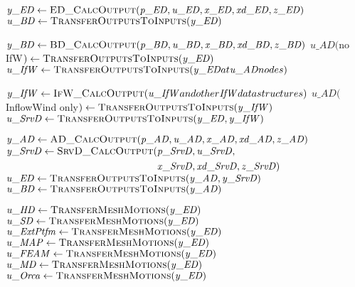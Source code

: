 \documentclass[10pt,letterpaper,oneside,notitlepage]{article}
\begin{document}
\begin{algorithmic}[1]

\State
   \State $\mathit{y\_ED} \gets \Call{ED\_CalcOutput}{\mathit{p\_ED},\mathit{u\_ED},\mathit{x\_ED},\mathit{xd\_ED},\mathit{z\_ED}}$
   \State $\mathit{u\_BD}  \gets \Call{TransferOutputsToInputs}{\mathit{y\_ED}}$

\State
   \State $\mathit{y\_BD} \gets \Call{BD\_CalcOutput}{\mathit{p\_BD},\mathit{u\_BD},\mathit{x\_BD},\mathit{xd\_BD},\mathit{z\_BD}}$
   \State $\mathit{u\_AD}($no IfW$)  \gets \Call{TransferOutputsToInputs}{\mathit{y\_ED}}$
   \State $\mathit{u\_IfW} \gets \Call{TransferOutputsToInputs}{\mathit{y\_ED} at \mathit{u\_AD} nodes}$

\State
   \State $\mathit{y\_IfW} \gets \Call{IfW\_CalcOutput}{\mathit{u\_IfW} and other \mathit{IfW} data structures}$
   \State $\mathit{u\_AD}($InflowWind only$) \gets \Call{TransferOutputsToInputs}{\mathit{y\_IfW}}$
   \State $\mathit{u\_SrvD} \gets \Call{TransferOutputsToInputs}{\mathit{y\_ED},\mathit{y\_IfW}}$

\State
   \State $\mathit{y\_AD} \gets \Call{AD\_CalcOutput}{\mathit{p\_AD},\mathit{u\_AD},\mathit{x\_AD},\mathit{xd\_AD},\mathit{z\_AD}}$
   \State $\mathit{y\_SrvD} \gets \Call{SrvD\_CalcOutput}{}( \!
            \begin{aligned}[t]
                               & \mathit{p\_SrvD},\mathit{u\_SrvD}, \\
                               & \mathit{x\_SrvD},\mathit{xd\_SrvD},\mathit{z\_SrvD}) \\
            \end{aligned}$
   \State $\mathit{u\_ED} \gets \Call{TransferOutputsToInputs}{\mathit{y\_AD},\mathit{y\_SrvD}}$
   \State $\mathit{u\_BD} \gets \Call{TransferOutputsToInputs}{\mathit{y\_AD}}$

\State

   \State $\mathit{u\_HD}   \gets \Call{TransferMeshMotions}{\mathit{y\_ED}}$
   \State $\mathit{u\_SD}   \gets \Call{TransferMeshMotions}{\mathit{y\_ED}}$
   \State $\mathit{u\_ExtPtfm}   \gets \Call{TransferMeshMotions}{\mathit{y\_ED}}$
   \State $\mathit{u\_MAP}  \gets \Call{TransferMeshMotions}{\mathit{y\_ED}}$
   \State $\mathit{u\_FEAM} \gets \Call{TransferMeshMotions}{\mathit{y\_ED}}$
   \State $\mathit{u\_MD}   \gets \Call{TransferMeshMotions}{\mathit{y\_ED}}$
   \State $\mathit{u\_Orca} \gets \Call{TransferMeshMotions}{\mathit{y\_ED}}$


\end{algorithmic}
\end{document}

